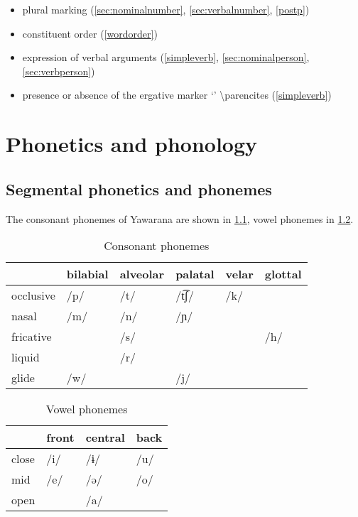\documentclass{memoir}
\begin{document}
\begin{itemize}
\tightlist
\item
  plural marking (\cref{sec:nominalnumber}, \cref{sec:verbalnumber},
  \cref{postp})
\item
  constituent order (\cref{wordorder})
\item
  expression of verbal arguments (\cref{simpleverb},
  \cref{sec:nominalperson}, \cref{sec:verbperson})
\item
  presence or absence of the ergative marker  `'
  \textbackslash parencites (\cref{simpleverb})
\end{itemize}

\chapter{\texorpdfstring{Phonetics and phonology
\label{phono}}{Phonetics and phonology }}

\section{\texorpdfstring{Segmental phonetics and phonemes
\label{sec:segmental}}{Segmental phonetics and phonemes }}

The consonant phonemes of Yawarana are shown in \cref{tab:consonants},
vowel phonemes in \cref{tab:vowels}.

\begin{table}
\caption{Consonant phonemes}
\label{tab:consonants}
\centering
\begin{tabular}{llllll}
\toprule
          & bilabial & alveolar & palatal & velar & glottal \\
\midrule
occlusive &     /p/  &     /t/  &  /t͡ʃ/  &   /k/ &         \\
    nasal &     /m/  &     /n/  &    /ɲ/  &       &         \\
fricative &          &     /s/  &         &       &    /h/  \\
   liquid &          &     /r/  &         &       &         \\
    glide &     /w/  &          &     /j/ &       &         \\
\bottomrule
\end{tabular}

\end{table}

\begin{table}
\caption{Vowel phonemes}
\label{tab:vowels}
\centering
\begin{tabular}{llll}
\toprule
      & front & central & back \\
\midrule
close &  /i/  &    /ɨ/  & /u/  \\
  mid &  /e/  &    /ə/  & /o/  \\
 open &       &    /a/  &      \\
\bottomrule
\end{tabular}

\end{table}
\end{document}
